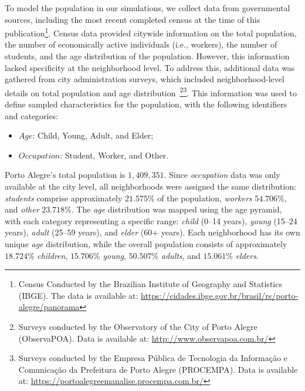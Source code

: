 To model the population in our simulations, we collect data from governmental sources, including the most recent completed census at the time of this publication\footnote{Census Conducted by the Brazilian Institute of Geography and Statistics (IBGE). The data is available at:  \url{https://cidades.ibge.gov.br/brasil/rs/porto-alegre/panorama}}. Census data provided citywide information on the total population, the number of economically active individuals (i.e., workers), the number of students, and the age distribution of the population. However, this information lacked specificity at the neighborhood level.
To address this, additional data was gathered from city administration surveys, which included neighborhood-level details on total population and age distribution~\footnote{Surveys conducted by the Observatory of the City of Porto Alegre (ObservaPOA). Data is available at: \url{http://www.observapoa.com.br/}}\footnote{Surveys conducted by the Empresa Pública de Tecnologia da Informação e Comunicação da Prefeitura de Porto Alegre (PROCEMPA). Data is available at: \url{https://portoalegreemanalise.procempa.com.br/}}.
This information was used to define sampled characteristics for the population, with the following identifiers and categories:
\begin{itemize}
    \item $Age$: Child, Young, Adult, and Elder;
    \item $Occupation$: Student, Worker, and Other.
\end{itemize}

Porto Alegre's total population is $1,409,351$. Since \textit{occupation} data was only available at the city level, all neighborhoods were assigned the same distribution: \textit{students} comprise approximately $21.575\%$ of the population, \textit{workers} $54.706\%$, and \textit{other} $23.718\%$.
The \textit{age} distribution was mapped using the age pyramid, with each category representing a specific range: \textit{child} (0–14 years), \textit{young} (15–24 years), \textit{adult} (25–59 years), and \textit{elder} (60+ years). Each neighborhood has its own unique \textit{age} distribution, while the overall population consists of approximately $18.724\%$ \textit{children}, $15.706\%$ \textit{young}, $50.507\%$ \textit{adults}, and $15.061\%$ \textit{elders}. 


